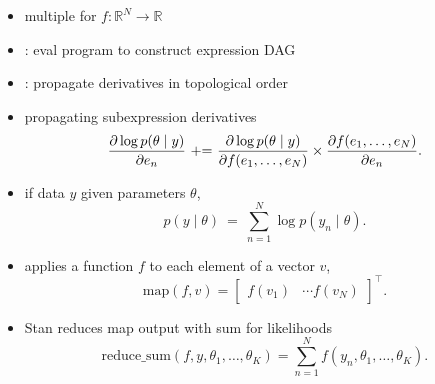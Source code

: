 \documentclass[9pt]{report}
\begin{document}
\begin{itemize}
\item {} multiple for $f: \mathbb{R}^N \rightarrow \mathbb{R}$
\item {}: eval program to construct expression DAG
\item {}: propagate derivatives in topological order
\vspace*{9pt}
\item {} propagating subexpression derivatives
\[
  \frac{\displaystyle \partial \log p(\theta \mid y)}{\displaystyle \partial e_n}
  \ {+}{=} \
  \frac{\displaystyle \partial \log p(\theta \mid y)}{\displaystyle \partial f(e_1, \ldots, e_N)}
  \times
  \frac{\displaystyle \partial f(e_1, \ldots, e_N)}{\displaystyle \partial e_n}.
\]
\vspace*{-9pt}
\end{itemize}

\begin{itemize}
\item if data $y$  given parameters $\theta$, 
  \[\textstyle
    p(y \mid \theta) \ = \ \sum_{n=1}^N \log p(y_n \mid \theta).
  \]
\item {} applies a function $f$ to each element of a vector
  $v$, 
  \[\textstyle
    \textrm{map}(f, v) = \begin{bmatrix} f(v_1) & \cdots
      f(v_N) \end{bmatrix}^{\top}.
  \]
\item Stan reduces map output with sum for likelihoods
  \[\textstyle
    \textrm{reduce\_sum}(f, y, \theta_1, \ldots, \theta_K) =
    \sum_{n=1}^N f(y_n, \theta_1, \ldots, \theta_K).
  \]
\end{itemize}

\end{document}
